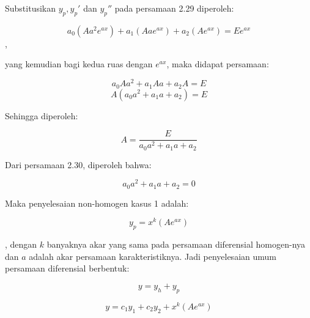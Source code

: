 \begin{enumerate}[1.]
	Substitusikan \begin{math} y_p, y_p' \end{math} dan \begin{math} y_p'' \end{math} pada persamaan 2.29 diperoleh:

	\begin{equation} a_0 (Aa^{2} e^{ax}) + a_1 (Aae^{ax}) + a_2 (Ae^{ax}) = Ee^{ax} \end{equation},

	yang kemudian bagi kedua ruas dengan \begin{math} e^{ax} \end{math}, maka didapat persamaan:

	\begin{displaymath} a_0 Aa^{2} + a_1 Aa + a_2 A = E \end{displaymath}
	\begin{displaymath} A(a_0 a^{2} + a_1 a + a_2) = E \end{displaymath}

	Sehingga diperoleh:

	\begin{equation} A = \dfrac{E}{a_0 a^{2} + a_1 a + a_2} \end{equation}

	Dari persamaan 2.30, diperoleh bahwa:

	\begin{displaymath} a_0 a^{2} + a_1 a + a_2 = 0 \end{displaymath}

	Maka penyelesaian non-homogen kasus 1 adalah:
	
	\begin{equation} y_p = x^{k} (Ae^{ax}) \end{equation}

	, dengan \begin{math} k \end{math} banyaknya akar yang sama pada persamaan diferensial homogen-nya dan \begin{math} a \end{math} adalah akar persamaan karakteristiknya. Jadi penyelesaian umum persamaan diferensial berbentuk:

	\begin{displaymath} y = y_h + y_p \end{displaymath}
		
	\begin{equation} y = c_1 y_1 + c_2 y_2 + x^{k} (Ae^{ax}) \end{equation}


\end{enumerate}
